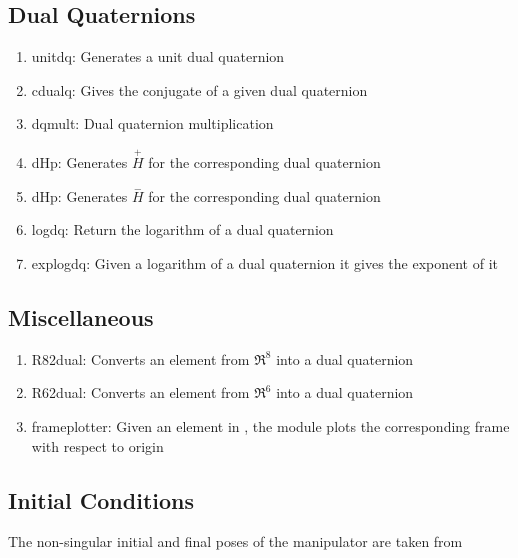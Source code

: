 \documentclass[a4paper,12pt]{article}
\newcommand{\Hp}{\ensuremath{\stackrel{+}{H}}\xspace}
\newcommand{\Hn}{\ensuremath{\stackrel{-}{H}}\xspace}
\begin{document}
\subsection{Dual Quaternions}
\begin{enumerate}
	\item unitdq: Generates a unit dual quaternion
	\item cdualq: Gives the conjugate of a given dual quaternion
	\item dqmult: Dual quaternion multiplication
	\item dHp: Generates \Hp for the corresponding dual quaternion
	\item dHp: Generates \Hn for the corresponding dual quaternion
	\item logdq: Return the logarithm of a dual quaternion
	\item explogdq: Given a logarithm of a dual quaternion it gives the exponent of it
\end{enumerate}
\subsection{Miscellaneous}
\begin{enumerate}
	\item R82dual: Converts an element from $\Re^8$ into a dual quaternion
	\item R62dual: Converts an element from $\Re^6$ into a dual quaternion
	\item frameplotter: Given an element in \se, the module plots the corresponding frame with respect to origin
\end{enumerate}
\subsection{Initial Conditions}
The non-singular initial and final poses of the manipulator are taken from \cite{ghosal2006robotics}
\end{document}
